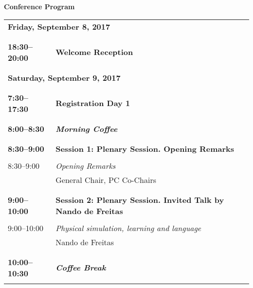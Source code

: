 \setlength{\parindent}{0in}
\setlength{\parskip}{2ex}
\renewcommand{\baselinestretch}{0.87}

\begin{center}
{\Large \bf
  Conference Program
}
\end{center}
\vspace{3mm}
\begin{tabular}{p{20mm}p{128mm}}
\multicolumn{2}{l}{\bf Friday, September 8, 2017} \\
\\
\\{\bf 18:30--20:00} & {\bf Welcome Reception} \\
\\
\\\multicolumn{2}{l}{\bf Saturday, September 9, 2017} \\
\\
\\{\bf 7:30--17:30} & {\bf Registration Day 1} \\
\\
\\{\bf 8:00--8:30} & {\bf\em Morning Coffee} \\
\\
\\{\bf 8:30--9:00} & {\bf Session 1: Plenary Session. Opening Remarks } \\
\\
8:30--9:00 & {\em Opening Remarks}\\
         & General Chair, PC Co-Chairs\\
\\
\\{\bf 9:00--10:00} & {\bf Session 2: Plenary Session. Invited Talk by Nando de Freitas } \\
\\
9:00--10:00 & {\em Physical simulation, learning and language}\\
         & Nando de Freitas\\
\\
\\{\bf 10:00--10:30} & {\bf\em Coffee Break} \\
\\
\end{tabular}
\newpage
